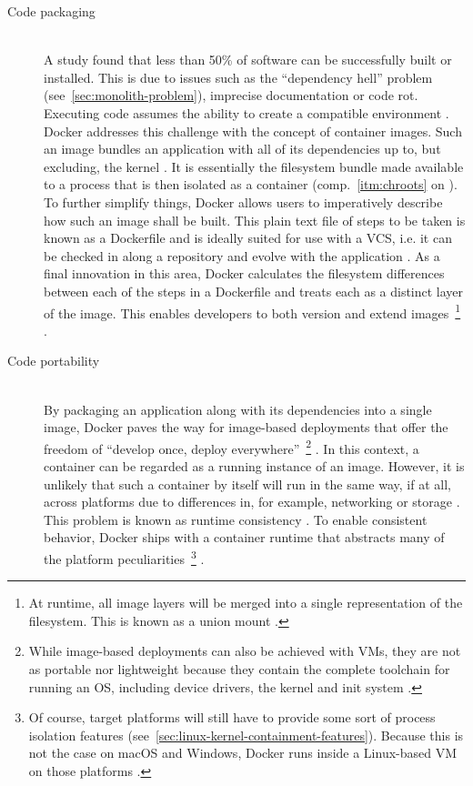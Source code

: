 \begin{description}
  \item[Code packaging]
  \hfill \\
  A study found that less than 50\% of software can be successfully built or installed.  This is due to issues such as the \enquote{dependency hell} problem (see~\autoref{sec:monolith-problem}), imprecise documentation or code rot. Executing code assumes the ability to create a compatible environment \cite[p.~72]{boettiger2015introduction}. Docker addresses this challenge with the concept of container images. Such an image bundles an application with all of its dependencies up to, but excluding, the kernel \cite[p.~1]{merkel2014docker}. It is essentially the filesystem bundle made available to a process that is then isolated as a container (comp.~\ref{itm:chroots} on ). To further simplify things, Docker allows users to imperatively describe how such an image shall be built. This plain text file of steps to be taken is known as a Dockerfile and is ideally suited for use with a \acs{VCS}, i.e. it can be checked in along a repository and evolve with the application \cite[p.~74]{boettiger2015introduction}. As a final innovation in this area, Docker calculates the filesystem differences between each of the steps in a Dockerfile and treats each as a distinct layer of the image. This enables developers to both version and extend images~\footnote{At runtime, all image layers will be merged into a single representation of the filesystem. This is known as a union mount \cite[p.~26]{pahl2015containerization}. } \cite[p.~1]{merkel2014docker}.

  \item[Code portability]
  \hfill \\
  By packaging an application along with its dependencies into a single image, Docker paves the way for image-based deployments that offer the freedom of \enquote{develop once, deploy everywhere}~\footnote{While image-based deployments can also be achieved with \acsp{VM}, they are not as portable nor lightweight because they contain the complete toolchain for running an \acs{OS}, including device drivers, the kernel and init system \cite[p.~203]{kang2016container} \cite[p.~2]{eder2016hypervisor}.} \cite[p.~203]{kang2016container}. In this context, a container can be regarded as a running instance of an image. However, it is unlikely that such a container by itself will run in the same way, if at all, across platforms due to differences in, for example, networking or storage \cite[pp.~74--75]{boettiger2015introduction}. This problem is known as runtime consistency \cite[p.~203]{kang2016container}. To enable consistent behavior, Docker ships with a container runtime that abstracts many of the platform peculiarities~\footnote{Of course, target platforms will still have to provide some sort of process isolation features (see~\autoref{sec:linux-kernel-containment-features}). Because this is not the case on macOS and Windows, Docker runs inside a Linux-based \acs{VM} on those platforms \cite[p.~5]{merkel2014docker}.} \cite[p.~75]{boettiger2015introduction}.


\end{description}
